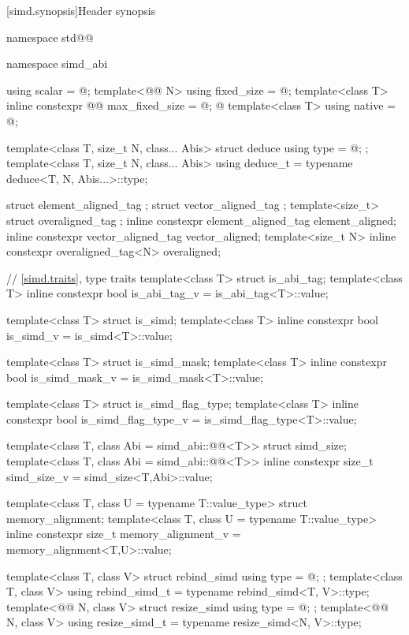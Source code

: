 [simd.synopsis]{Header \texorpdfstring{}{<simd>} synopsis}

\begin{codeblock}
namespace std@@ {
  namespace simd_abi {
    using scalar = @\seebelow@;
    template<@@ N> using fixed_size = @\seebelow@;
    template<class T> inline constexpr @@ max_fixed_size = @\impdef;%
    @
    template<class T> using native = @\impdef@;

    template<class T, size_t N, class... Abis> struct deduce { using type = @\seebelow@; };
    template<class T, size_t N, class... Abis> using deduce_t =
      typename deduce<T, N, Abis...>::type;
  }

  struct element_aligned_tag {};
  struct vector_aligned_tag {};
  template<size_t> struct overaligned_tag {};
  inline constexpr element_aligned_tag element_aligned{};
  inline constexpr vector_aligned_tag vector_aligned{};
  template<size_t N> inline constexpr overaligned_tag<N> overaligned{};

  // \ref{simd.traits},  type traits
  template<class T> struct is_abi_tag;
  template<class T> inline constexpr bool is_abi_tag_v = is_abi_tag<T>::value;

  template<class T> struct is_simd;
  template<class T> inline constexpr bool is_simd_v = is_simd<T>::value;

  template<class T> struct is_simd_mask;
  template<class T> inline constexpr bool is_simd_mask_v = is_simd_mask<T>::value;

  template<class T> struct is_simd_flag_type;
  template<class T> inline constexpr bool is_simd_flag_type_v =
    is_simd_flag_type<T>::value;

  template<class T, class Abi = simd_abi::@@<T>> struct simd_size;
  template<class T, class Abi = simd_abi::@@<T>>
    inline constexpr size_t simd_size_v = simd_size<T,Abi>::value;

  template<class T, class U = typename T::value_type> struct memory_alignment;
  template<class T, class U = typename T::value_type>
    inline constexpr size_t memory_alignment_v = memory_alignment<T,U>::value;

  template<class T, class V> struct rebind_simd { using type = @\seebelow@; };
  template<class T, class V> using rebind_simd_t = typename rebind_simd<T, V>::type;
  template<@@ N, class V> struct resize_simd { using type = @\seebelow@; };
  template<@@ N, class V> using resize_simd_t = typename resize_simd<N, V>::type;

}
\end{codeblock}
